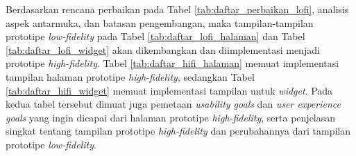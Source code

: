 




Berdasarkan rencana perbaikan pada Tabel \ref{tab:daftar_perbaikan_lofi}, analisis aspek antarmuka, dan batasan pengembangan, maka tampilan-tampilan prototipe \textit{low-fidelity} pada Tabel \ref{tab:daftar_lofi_halaman} dan Tabel \ref{tab:daftar_lofi_widget} akan dikembangkan dan diimplementasi menjadi prototipe \textit{high-fidelity}. Tabel \ref{tab:daftar_hifi_halaman} memuat implementasi tampilan halaman prototipe \textit{high-fidelity}, sedangkan Tabel \ref{tab:daftar_hifi_widget} memuat implementasi tampilan untuk \textit{widget}. Pada kedua tabel tersebut dimuat juga pemetaan \textit{usability goals} dan \textit{user experience goals} yang ingin dicapai dari halaman prototipe \textit{high-fidelity}, serta penjelasan singkat tentang tampilan prototipe \textit{high-fidelity} dan perubahannya dari tampilan prototipe \textit{low-fidelity}.


\newlength{\hifiwidth}
\setlength{\hifiwidth}{0.315\textwidth}

\newlength{\hifidescwidth}
\setlength{\hifidescwidth}{0.315\textwidth}

\newcommand{\hifidesc}[1]{\desc{\hifidescwidth}{#1}}

\newcommand{\hifi}[1]{\begin{center}\texttt{[image: \#1]}\end{center}}
\newcommand{\hifiwidget}[2]{\begin{center}\texttt{[image: \#2]}\end{center}}

